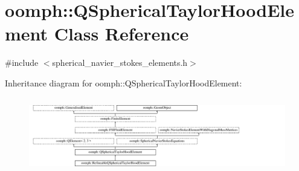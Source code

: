 \hypertarget{classoomph_1_1QSphericalTaylorHoodElement}{}\section{oomph\+:\+:Q\+Spherical\+Taylor\+Hood\+Element Class Reference}
\label{classoomph_1_1QSphericalTaylorHoodElement}


{\ttfamily \#include $<$spherical\+\_\+navier\+\_\+stokes\+\_\+elements.\+h$>$}

Inheritance diagram for oomph\+:\+:Q\+Spherical\+Taylor\+Hood\+Element\+:\begin{figure}[H]
\begin{center}
\leavevmode
\includegraphics[height=3.343283cm]{classoomph_1_1QSphericalTaylorHoodElement}
\end{center}
\end{figure}
